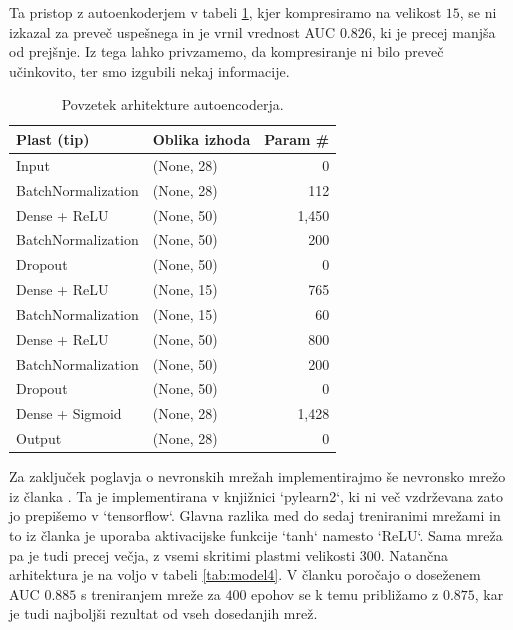 \documentclass{article}
\begin{document}
Ta pristop z autoenkoderjem v tabeli \ref{tab:autoencoder}, kjer kompresiramo na velikost $15$, se ni izkazal za preveč uspešnega in je vrnil vrednost AUC $0.826$, ki je precej manjša od prejšnje. Iz tega lahko privzamemo, da kompresiranje ni bilo preveč učinkovito, ter smo izgubili nekaj informacije.
\begin{table}[H]
\centering
\begin{tabular}{|l|l|r|}
\hline
\textbf{Plast (tip)}         & \textbf{Oblika izhoda} & \textbf{Param \#} \\
\hline
Input                        & (None, 28)             & 0           \\
BatchNormalization           & (None, 28)             & 112         \\
Dense + ReLU               & (None, 50)             & 1,450       \\
BatchNormalization           & (None, 50)             & 200         \\
Dropout                      & (None, 50)             & 0           \\
Dense + ReLU               & (None, 15)             & 765         \\
BatchNormalization           & (None, 15)             & 60          \\
Dense + ReLU                 & (None, 50)             & 800         \\
BatchNormalization           & (None, 50)             & 200         \\
Dropout                      & (None, 50)             & 0           \\
Dense + Sigmoid              & (None, 28)             & 1,428       \\
Output						 &	(None, 28)            & 0			\\	
\hline
\end{tabular}
\caption{Povzetek arhitekture autoencoderja.}
\label{tab:autoencoder}
\end{table}
Za zaključek poglavja o nevronskih mrežah implementirajmo še nevronsko mrežo iz članka \cite{Baldi:2014kfa}. Ta je implementirana v knjižnici `pylearn2`, ki ni več vzdrževana zato jo prepišemo v `tensorflow`. Glavna razlika med do sedaj treniranimi mrežami in to iz članka je uporaba aktivacijske funkcije `tanh` namesto `ReLU`. Sama mreža pa je tudi precej večja, z vsemi skritimi plastmi velikosti $300$. Natančna arhitektura je na voljo v tabeli \ref{tab:model4}. V članku poročajo o doseženem AUC $0.885$ s treniranjem mreže za $400$ epohov se k temu približamo z $0.875$, kar je tudi najboljši rezultat od vseh dosedanjih mrež.
\end{document}
